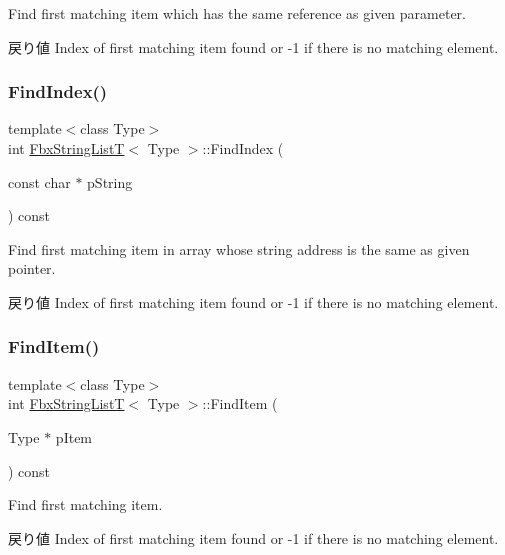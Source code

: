 Find first matching item which has the same reference as given parameter. \begin{DoxyReturn}{戻り値}
Index of first matching item found or -\/1 if there is no matching element. 
\end{DoxyReturn}
\mbox{\label{class_fbx_string_list_t_a50609bf493c67a131c531409cbfe8f8b}} 
\subsubsection{\texorpdfstring{Find\+Index()}{FindIndex()}\hspace{0.1cm}{\footnotesize\ttfamily [2/2]}}
{\footnotesize\ttfamily template$<$class Type$>$ \\
int \hyperlink{class_fbx_string_list_t}{Fbx\+String\+ListT}$<$ Type $>$\+::Find\+Index (\begin{DoxyParamCaption}\item[{const char $\ast$}]{p\+String }\end{DoxyParamCaption}) const}

Find first matching item in array whose string address is the same as given pointer. \begin{DoxyReturn}{戻り値}
Index of first matching item found or -\/1 if there is no matching element. 
\end{DoxyReturn}
\mbox{\label{class_fbx_string_list_t_a9d903a2352e10982c18d3e37fcc58ef6}} 
\subsubsection{\texorpdfstring{Find\+Item()}{FindItem()}}
{\footnotesize\ttfamily template$<$class Type$>$ \\
int \hyperlink{class_fbx_string_list_t}{Fbx\+String\+ListT}$<$ Type $>$\+::Find\+Item (\begin{DoxyParamCaption}\item[{Type $\ast$}]{p\+Item }\end{DoxyParamCaption}) const}

Find first matching item. \begin{DoxyReturn}{戻り値}
Index of first matching item found or -\/1 if there is no matching element. 
\end{DoxyReturn}
\mbox{\label{class_fbx_string_list_t_acb79b34d154663f6f7478bfa823641b4}} 
